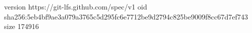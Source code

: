 version https://git-lfs.github.com/spec/v1
oid sha256:5eb4bf9ae3a079a3765c5d295fc6e7712be9d2794c825be9009f8cc67d7ef743
size 174916
